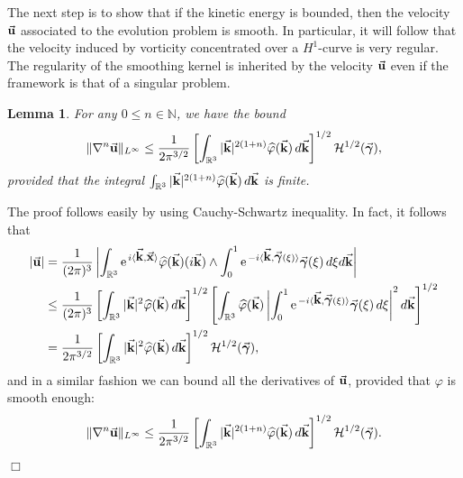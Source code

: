 \documentclass[a4paper,11pt]{article}
\numberwithin{equation}{section}
\newtheorem{lemma}{Lemma}
\newenvironment{proof}[1][Proof]{{\sc #1.} }{\hfill $\Box$}
\newcommand{\R}{\mathbb{R}}
\newcommand{\N}{\mathbb{N}}
\newcommand{\la}{\langle}
\newcommand{\ra}{\rangle}
\newcommand{\U}{\mbox{$\vec{\bf u}$}}
\newcommand{\bgamma}{\mbox{$\vec{\boldsymbol \gamma}$}}
\renewcommand{\k}{\mbox{$\vec{\bf k}$}}
\newcommand{\x}{\mbox{$\vec{\bf x}$}}
\begin{document}
\vspace{.2cm}
%
The next step is to show that if the kinetic energy is bounded, then
the velocity $\U$ associated to the evolution problem is smooth. In
particular, it will follow that the velocity induced by vorticity
concentrated over a $H^1$-curve is very regular. The regularity of the
smoothing kernel is inherited by the velocity $\U$ even if the
framework is that of a singular problem. 
\begin{lemma}
\label{lemma:bound-u}
For any $0\le n \in\N$, we have the bound
\begin{equation}
\|\nabla^n \U\|_{L^\infty} \le \frac{1}{2\pi^{3/2}}\left[\int_{\R^3}
  |\k|^{2(1+n)} 
  \widehat\varphi(\k) \,d\k \right]^{1/2} \mathcal{H}^{1/2}(\bgamma), 
\end{equation}
provided that the integral $\int_{\R^3} |\k|^{2(1+n)}
  \widehat\varphi(\k) \,d\k$ is finite. 
\end{lemma}
\begin{proof}
The proof follows easily by using Cauchy-Schwartz inequality. In fact,
it follows that
\begin{equation*}
  \begin{aligned}
 |\U| & = \frac{1}{(2\pi)^3}\left|\int_{\R^3} \text{e}^{\,i\la \k,\x\ra}
 \widehat\varphi(\k)(i\k) \wedge \int_0^1
 \text{e}^{\,-i\la\k,\bgamma(\xi)\ra} \bgamma(\xi) \,d\xi d\k\right|\\
 & \le \frac{1}{(2\pi)^3}\left[\int_{\R^3} |\k|^2
 \widehat\varphi(\k)\,d\k\right]^{1/2} 
 \left[\int_{\R^3} \widehat\varphi(\k) \left|\int_0^1
 \text{e}^{\,-i\la \k,\bgamma(\xi)\ra} \bgamma(\xi)\,d\xi\right|^2
 d\k\right]^{1/2}\\ 
& = \frac{1}{2\pi^{3/2}}\left[\int_{\R^3} |\k|^2
 \widehat\varphi(\k)\,d\k \right]^{1/2} 
 \mathcal{H}^{1/2}(\bgamma),
  \end{aligned}
\end{equation*}
and in a similar fashion we can bound all the derivatives of $\U$,
provided that $\varphi$ is smooth enough: 
\begin{equation*}
\|\nabla^n \U\|_{L^\infty} \le \frac{1}{2\pi^{3/2}}\left[\int_{\R^3}
  |\k|^{2(1+n)} \widehat\varphi(\k) \,d\k \right]^{1/2}
\mathcal{H}^{1/2}(\bgamma). 
\end{equation*}  
\end{proof}
\end{document}
